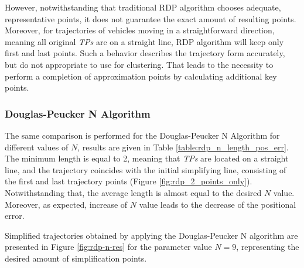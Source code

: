 However, notwithstanding that traditional RDP algorithm chooses adequate, representative points, it does not guarantee the exact amount of resulting points. Moreover, for trajectories of vehicles moving in a straightforward direction, meaning all original \textit{TPs} are on a straight line, RDP algorithm will keep only first and last points. Such a behavior describes the trajectory form accurately, but do not appropriate to use for clustering. That leads to the necessity to perform a completion of approximation points by calculating additional key points.

\subsubsection{Douglas-Peucker N Algorithm}

The same comparison is performed for the Douglas-Peucker N Algorithm for different values of $N$, results are given in Table \ref{table:rdp_n_length_pos_err}. The minimum length is equal to 2, meaning that \textit{TPs} are located on a straight line, and the trajectory coincides with the initial simplifying line, consisting of the first and last trajectory points (Figure \ref{fig:rdp_2_points_only}). Notwithstanding that, the average length is almost equal to the desired $N$ value. Moreover, as expected, increase of $N$ value leads to the decrease of the positional error. 

Simplified trajectories obtained by applying the Douglas-Peucker N algorithm are presented in Figure \ref{fig:rdp-n-res} for the parameter value $N = 9$, representing the desired amount of simplification points.

